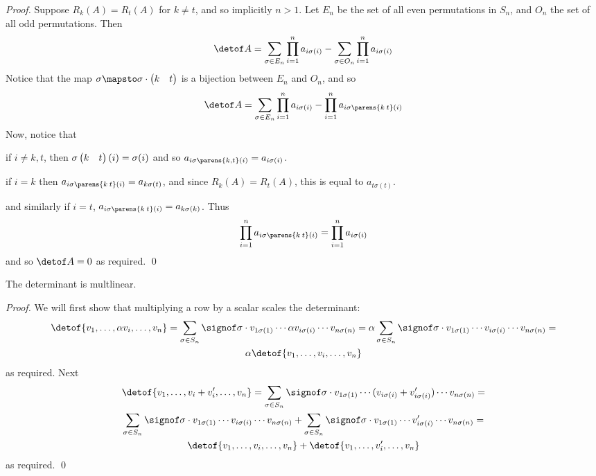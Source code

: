 \begin{proof}

    Suppose $R_k(A)=R_t(A)$ for $k\neq t$, and so implicitly $n>1$.
    Let $E_n$ be the set of all even permutations in $S_n$, and $O_n$ the set of all odd permutations.
    Then
    \[ \detof A = \sum_{\sigma\in E_n}\prod_{i=1}^n a_{i\sigma(i)} - \sum_{\sigma\in O_n}\prod_{i=1}^n a_{i\sigma(i)} \]
    Notice that the map $\sigma\mapsto\sigma\cdot\pmat{k&t}$ is a bijection between $E_n$ and $O_n$, and so
    \[ \detof A = \sum_{\sigma\in E_n}\prod_{i=1}^n a_{i\sigma(i)} - \prod_{i=1}^n a_{i\sigma\parens{k\:t}(i)} \]
    Now, notice that
    \blist
        \item if $i\neq k,t$, then $\sigma\begin{pmatrix}k&t\end{pmatrix}(i)=\sigma(i)$ and so $a_{i\sigma\parens{k,t}(i)}=a_{i\sigma(i)}$.
        \item if $i=k$ then $a_{i\sigma\parens{k\:t}(i)}=a_{k\sigma(t)}$, and since $R_k(A)=R_t(A)$, this is equal to $a_{t\sigma(t)}$.
        \item and similarly if $i=t$, $a_{i\sigma\parens{k\:t}(i)}=a_{k\sigma(k)}$.
    \elist
    Thus
    \[ \prod_{i=1}^n a_{i\sigma\parens{k\:t}(i)} = \prod_{i=1}^n a_{i\sigma(i)} \]
    and so $\detof A=0$ as required.
    \qed

\end{proof}

\begin{prop*}

    The determinant is multlinear.

\end{prop*}

\begin{proof}

    We will first show that multiplying a row by a scalar scales the determinant:
    \begin{multline*}
        \detof{v_1,\dots,\alpha v_i,\dots,v_n} = \sum_{\sigma\in S_n}\signof\sigma\cdot v_{1\sigma(1)}\cdots \alpha v_{i\sigma(i)}\cdots v_{n\sigma(n)} =
        \alpha\sum_{\sigma\in S_n}\signof\sigma\cdot v_{1\sigma(1)}\cdots v_{i\sigma(i)}\cdots v_{n\sigma(n)} =\\
        \alpha\detof{v_1,\dots,v_i,\dots,v_n}
    \end{multline*}
    as required.
    Next
    \begin{multline*}
        \detof{v_1,\dots,v_i+v'_i,\dots,v_n} = \sum_{\sigma\in S_n}\signof\sigma\cdot v_{1\sigma(1)}\cdots(v_{i\sigma(i)}+v'_{i\sigma(i)})\cdots v_{n\sigma(n)} =\\
        \sum_{\sigma\in S_n}\signof\sigma\cdot v_{1\sigma(1)}\cdots v_{i\sigma(i)}\cdots v_{n\sigma(n)} + \sum_{\sigma\in S_n}\signof\sigma\cdot v_{1\sigma(1)}\cdots v'_{i\sigma(i)}\cdots v_{n\sigma(n)} =\\
        \detof{v_1,\dots,v_i,\dots,v_n} + \detof{v_1,\dots,v'_i,\dots,v_n}
    \end{multline*}
    as required.
    \qed

\end{proof}

